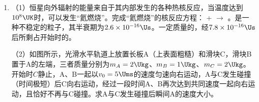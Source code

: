 \documentclass[\gkver]{gaokaozhenti}
\begin{document}
\begin{enumerate}
{$P$点的振动加强。

（2）设发生全反射的临界角为$C$，由折射定律得

$\sin C=\frac{1}{n}$④，

代入数据得

$C=45\Udu$⑤，

光路图如图所示，由几何关系可知光线在AB边和BC边的入射角均为$60\Udu$，均发生全反射。设光线在CD边的入射角为$\alpha$，折射角为$\beta$，由几何关系得$\alpha=30\Udu$，小于临界角，光线第一次射出棱镜是在CD边，由折射定律得

$n=\frac{\sin\beta}{\sin\alpha}$⑥，

代入数据得$\beta=45\Udu$⑦。

}

\item
（1）恒星向外辐射的能量来自于其内部发生的各种热核反应，当温度达到$10^{8}\UK$时，可以发生“氦燃烧”。完成“氦燃烧”的核反应方程： +  $\to$ 。是一种不稳定的粒子，其半衰期为$2.6\times10^{-16}\Us$。一定质量的，经$7.8\times10^{-16}\Us$后所剩占开始时的。

（2）如图所示，光滑水平轨道上放置长板A（上表面粗糙）和滑块C，滑块B置于A的左端，三者质量分别为$m_{A}=2\Ukg$、$m_{B}=1\Ukg$、$m_{C}=2\Ukg$。开始时\textbf{$C$}静止，A、B一起以$v_{0}=5\Ums$的速度匀速向右运动，A与C发生碰撞（时间极短）后C向右运动，经过一段时间A、B再次达到共同速度一起向右运动，且恰好不再与C碰撞。求A与C发生碰撞后瞬间A的速度大小。



\end{enumerate}
\end{document}
